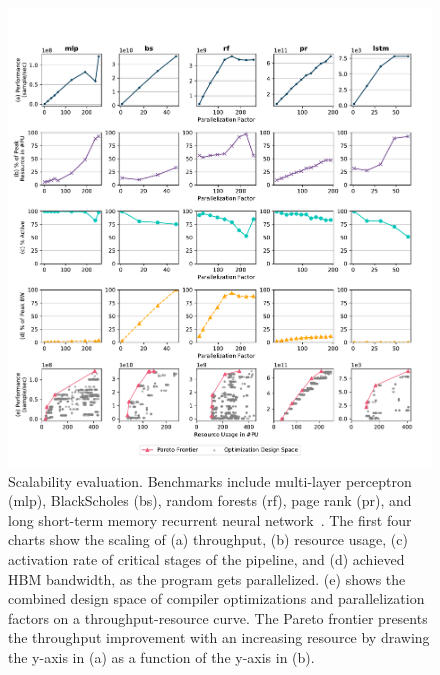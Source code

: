 \begin{figure}
\centering
\includegraphics[width=1\textwidth]{figs/par_thesis.pdf}
\caption[Scalability evaluation]{
  Scalability evaluation. 
  Benchmarks include multi-layer perceptron (mlp), BlackScholes (bs), random forests (rf), page rank
  (pr), and long short-term memory recurrent neural network~\cite{hochreiter1997long}.
  The first four charts show the scaling of
  (a) throughput, 
  (b) resource usage, 
  (c) activation rate of critical stages of the pipeline, 
  and (d) achieved HBM bandwidth, as the program gets parallelized.
  (e) shows the combined design space of compiler optimizations and parallelization factors on a
  throughput-resource curve. 
  The Pareto frontier presents the throughput improvement with an increasing resource by drawing the y-axis in (a) as a function of the y-axis in (b).
}
\label{fig:par}
\end{figure}

